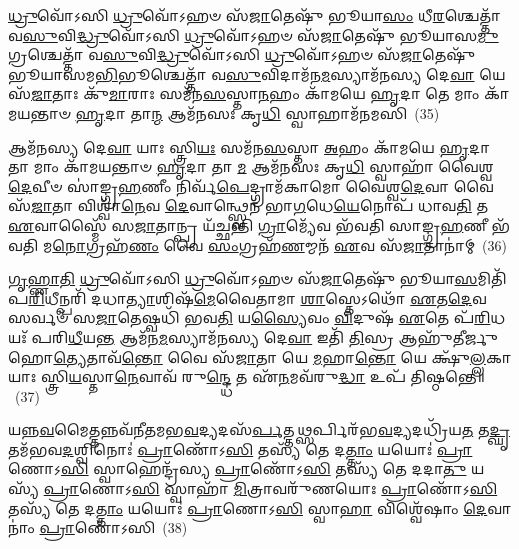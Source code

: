 {\anuvakamend[{𑌵𑌿 𑌹𑍍𑌯᳴𑌷𑍍𑌟𑌾𑌵𑌿𑍞᳴𑌶𑌤𑌿𑌶𑍍𑌚}]}%

\-\ul{𑌧𑍍𑌰𑍁}\-𑌵𑍋᳴\-𑌽𑌸𑌿 \ul{𑌧𑍍𑌰𑍁}\-𑌵𑍋᳴\-𑌽𑌹𑍞 𑌸᳴\-\ul{𑌜𑌾}\-𑌤𑍇𑌷𑍁᳴ 𑌭𑍂𑌯𑌾\-\ul{𑌸𑌂} 𑌧𑍀\-\ul{𑌰}\-𑌶𑍍𑌚𑍇𑌤𑍍𑌤𑌾᳴ 𑌵\-\ul{𑌸𑍁}\-𑌵𑌿\-\ul{𑌦𑍍𑌧𑍍𑌰𑍁}\-𑌵𑍋᳴\-𑌽𑌸𑌿 \ul{𑌧𑍍𑌰𑍁}\-𑌵𑍋᳴\-𑌽𑌹𑍞 𑌸᳴\-\ul{𑌜𑌾}\-𑌤𑍇𑌷𑍁᳴ 𑌭𑍂𑌯𑌾𑌸\-\ul{𑌮𑍁}\-𑌗𑍍𑌰𑌶𑍍𑌚𑍇𑌤𑍍𑌤𑌾᳴ 𑌵\-\ul{𑌸𑍁}\-𑌵𑌿\-\ul{𑌦𑍍𑌧𑍍𑌰𑍁}\-𑌵𑍋᳴\-𑌽𑌸𑌿 \ul{𑌧𑍍𑌰𑍁}\-𑌵𑍋᳴\-𑌽𑌹𑍞 𑌸᳴\-\ul{𑌜𑌾}\-𑌤𑍇𑌷𑍁᳴ 𑌭𑍂𑌯𑌾𑌸𑌮\-\ul{𑌭𑌿}\-𑌭𑍂𑌶𑍍𑌚𑍇𑌤𑍍𑌤𑌾᳴ 𑌵\-\ul{𑌸𑍁}\-𑌵𑌿𑌦𑌾𑌮᳴𑌨\-\ul{𑌮}\-𑌸𑍍𑌯𑌾𑌮᳴𑌨𑌸𑍍𑌯 𑌦𑍇\-\ul{𑌵𑌾} 𑌯𑍇 𑌸᳴\-\ul{𑌜𑌾}\-𑌤𑌾𑌃 𑌕𑍁᳴\-\ul{𑌮𑌾}\-𑌰𑌾𑌃 𑌸𑌮᳴𑌨\-\ul{𑌸}\-𑌸𑍍𑌤𑌾\-\ul{𑌨}\-𑌹𑌂 𑌕𑌾᳴𑌮𑌯𑍇 \ul{𑌹𑍃}\-𑌦𑌾 𑌤𑍇 𑌮𑌾𑌂 𑌕𑌾᳴𑌮𑌯𑌨𑍍𑌤𑌾𑍞 \ul{𑌹𑍃}\-𑌦𑌾 𑌤𑌾\-\ul{𑌨𑍍𑌮} 𑌆𑌮᳴𑌨𑌸𑌃 𑌕𑍃\-\ul{𑌧𑌿} 𑌸𑍍𑌵𑌾𑌹𑌾𑌮᳴𑌨𑌮𑌸𑌿~(35)

𑌆𑌮᳴𑌨𑌸𑍍𑌯 𑌦𑍇\-\ul{𑌵𑌾} 𑌯𑌾𑌃 𑌸𑍍𑌤𑍍𑌰𑌿\-\ul{𑌯𑌃} 𑌸𑌮᳴𑌨\-\ul{𑌸}\-𑌸𑍍𑌤𑌾 \ul{𑌅}\-𑌹𑌂 𑌕𑌾᳴𑌮𑌯𑍇 \ul{𑌹𑍃}\-𑌦𑌾 𑌤𑌾 𑌮𑌾𑌂 𑌕𑌾᳴𑌮𑌯𑌨𑍍𑌤𑌾𑍞 \ul{𑌹𑍃}\-𑌦𑌾 𑌤𑌾 \ul{𑌮} 𑌆𑌮᳴𑌨𑌸𑌃 𑌕𑍃\-\ul{𑌧𑌿} 𑌸𑍍𑌵𑌾𑌹𑌾᳴ 𑌵𑍈𑌶𑍍𑌵\-\ul{𑌦𑍇}\-𑌵𑍀𑍞 𑌸𑌾॑𑌙𑍍𑌗𑍍𑌰\-\ul{𑌹}\-𑌣𑍀𑌂 𑌨𑌿𑌰𑍍𑌵᳴\-\ul{𑌪𑍇}\-𑌦𑍍𑌗𑍍𑌰𑌾𑌮᳴𑌕𑌾𑌮𑍋 𑌵𑍈𑌶𑍍𑌵\-\ul{𑌦𑍇}\-𑌵𑌾 𑌵𑍈 𑌸᳴\-\ul{𑌜𑌾}\-𑌤𑌾 𑌵𑌿𑌶𑍍𑌵𑌾᳴\-\ul{𑌨𑍇}\-𑌵 \ul{𑌦𑍇}\-𑌵𑌾𑌨𑍍𑌥𑍍𑌸𑍍𑌵𑍇𑌨᳴ 𑌭𑌾\-\ul{𑌗}\-𑌧𑍇\-\ul{𑌯𑍇}\-𑌨𑍋𑌪᳴ 𑌧𑌾𑌵\-\ul{𑌤𑌿} 𑌤 \ul{𑌏}\-𑌵𑌾𑌸𑍍𑌮𑍈᳴ 𑌸\-\ul{𑌜𑌾}\-𑌤𑌾𑌨𑍍𑌪𑍍𑌰 𑌯᳴𑌚𑍍𑌛𑌨𑍍𑌤𑌿 \ul{𑌗𑍍𑌰𑌾}\-𑌮𑍍𑌯𑍇᳴𑌵 𑌭᳴𑌵𑌤𑌿 𑌸𑌾𑌙𑍍𑌗𑍍𑌰\-\ul{𑌹}\-𑌣𑍀 𑌭᳴𑌵𑌤𑌿 𑌮\-\ul{𑌨𑍋}\-𑌗𑍍𑌰𑌹᳴\-\ul{𑌣𑌂} 𑌵𑍈 \ul{𑌸𑌂}\-𑌗𑍍𑌰𑌹᳴\-\ul{𑌣}\-𑌮𑍍𑌮𑌨᳴ \ul{𑌏}\-𑌵 𑌸᳴\-\ul{𑌜𑌾}\-𑌤𑌾𑌨𑌾॑𑌮𑍍~(36)

\-\ul{𑌗𑍃}\-\-\ul{𑌹𑍍𑌣𑌾}\-\-\ul{𑌤𑌿} \ul{𑌧𑍍𑌰𑍁}\-𑌵𑍋᳴\-𑌽𑌸𑌿 \ul{𑌧𑍍𑌰𑍁}\-𑌵𑍋᳴\-𑌽𑌹𑍞 𑌸᳴\-\ul{𑌜𑌾}\-𑌤𑍇𑌷𑍁᳴ 𑌭𑍂𑌯𑌾\-\ul{𑌸}\-𑌮𑌿𑌤𑌿᳴ 𑌪\-\ul{𑌰𑌿}\-𑌧𑍀𑌨𑍍𑌪𑌰𑌿᳴ 𑌦𑌧𑌾\-\ul{𑌤𑍍𑌯𑌾}\-𑌶𑌿𑌷᳴\-\ul{𑌮𑍇}\-𑌵𑍈𑌤𑌾𑌮𑌾 \ul{𑌶𑌾}\-𑌸𑍍𑌤𑍇\-𑌽𑌥𑍋᳴ \ul{𑌏}\-𑌤\-\ul{𑌦𑍇}\-𑌵 𑌸𑌰𑍍𑌵𑍞᳴ 𑌸\-\ul{𑌜𑌾}\-𑌤𑍇𑌷𑍍𑌵𑌧𑌿᳴ 𑌭𑌵\-\ul{𑌤𑌿} 𑌯\-\ul{𑌸𑍍𑌯𑍈}\-𑌵𑌂 \ul{𑌵𑌿}\-𑌦𑍁𑌷᳴ \ul{𑌏}\-𑌤𑍇 𑌪᳴\-\ul{𑌰𑌿}\-𑌧𑌯𑌃᳴ 𑌪𑌰𑌿\-\ul{𑌧𑍀}\-𑌯\-\ul{𑌨𑍍𑌤} 𑌆𑌮᳴𑌨\-\ul{𑌮}\-𑌸𑍍𑌯𑌾𑌮᳴𑌨𑌸𑍍𑌯 𑌦𑍇\-\ul{𑌵𑌾} 𑌇𑌤𑌿᳴ \ul{𑌤𑌿}\-𑌸𑍍𑌰 𑌆𑌹𑍁᳴𑌤𑍀𑌰𑍍𑌜𑍁𑌹𑍋\-\ul{𑌤𑍍𑌯𑍇}\-𑌤𑌾𑌵᳴\-\ul{𑌨𑍍𑌤𑍋} 𑌵𑍈 𑌸᳴\-\ul{𑌜𑌾}\-𑌤𑌾 𑌯𑍇 \ul{𑌮}\-𑌹𑌾\-\ul{𑌨𑍍𑌤𑍋} 𑌯𑍇 𑌕𑍍𑌷𑍁᳴\-\ul{𑌲𑍍𑌲}\-𑌕𑌾 𑌯𑌾𑌃 𑌸𑍍𑌤𑍍𑌰𑌿\-\ul{𑌯}\-𑌸𑍍𑌤𑌾\-\ul{𑌨𑍇}\-𑌵𑌾𑌵᳴ 𑌰𑍁\-\ul{𑌨𑍍𑌦𑍍𑌧𑍇} 𑌤 𑌏᳴\-\ul{𑌨}\-𑌮𑌵᳴𑌰𑍁\-\ul{𑌦𑍍𑌧𑌾} 𑌉𑌪᳴ 𑌤𑌿𑌷𑍍𑌠𑌨𑍍𑌤𑍇॥~(37)

{\anuvakamend[{𑌸𑍍𑌵𑌾𑌹𑌾𑌮᳴𑌨𑌮𑌸𑌿 𑌸\-\ul{𑌜𑌾}\-𑌤𑌾𑌨𑌾𑍞᳴ 𑌰𑍁\-\ul{𑌨𑍍𑌦𑍍𑌧𑍇} 𑌪𑌞𑍍𑌚᳴ 𑌚}]}%

𑌯𑌨𑍍𑌨\-\ul{𑌵}\-𑌮𑍈𑌤𑍍𑌤𑌨𑍍𑌨𑌵᳴𑌨𑍀𑌤𑌮𑌭\-\ul{𑌵}\-𑌦𑍍𑌯𑌦𑌸᳴\-\ul{𑌰𑍍𑌪}\-𑌤𑍍𑌤\-\ul{𑌥𑍍𑌸}\-𑌰𑍍𑌪𑌿𑌰᳴𑌭\-\ul{𑌵}\-𑌦𑍍𑌯𑌦𑌧𑍍𑌰𑌿᳴𑌯\-\ul{𑌤} 𑌤\-\ul{𑌦𑍍𑌘𑍃}\-𑌤𑌮᳴𑌭𑌵\-\ul{𑌦}\-𑌶𑍍𑌵𑌿𑌨𑍋𑌃॑ \ul{𑌪𑍍𑌰𑌾}\-𑌣𑍋᳴\-𑌽\-\ul{𑌸𑌿} 𑌤𑌸𑍍𑌯᳴ 𑌤𑍇 𑌦\-\ul{𑌤𑍍𑌤𑌾𑌂} 𑌯𑌯𑍋𑌃॑ \ul{𑌪𑍍𑌰𑌾}\-𑌣𑍋\-𑌽\-\ul{𑌸𑌿} 𑌸𑍍𑌵𑌾𑌹𑍇𑌨𑍍𑌦𑍍𑌰᳴𑌸𑍍𑌯 \ul{𑌪𑍍𑌰𑌾}\-𑌣𑍋᳴\-𑌽\-\ul{𑌸𑌿} 𑌤𑌸𑍍𑌯᳴ 𑌤𑍇 𑌦𑌦𑌾\-\ul{𑌤𑍁} 𑌯𑌸𑍍𑌯᳴ \ul{𑌪𑍍𑌰𑌾}\-𑌣𑍋\-𑌽\-\ul{𑌸𑌿} 𑌸𑍍𑌵𑌾𑌹𑌾᳴ \ul{𑌮𑌿}\-𑌤𑍍𑌰𑌾𑌵𑌰𑍁᳴𑌣𑌯𑍋𑌃 \ul{𑌪𑍍𑌰𑌾}\-𑌣𑍋᳴\-𑌽\-\ul{𑌸𑌿} 𑌤𑌸𑍍𑌯᳴ 𑌤𑍇 𑌦\-\ul{𑌤𑍍𑌤𑌾𑌂} 𑌯𑌯𑍋𑌃॑ \ul{𑌪𑍍𑌰𑌾}\-𑌣𑍋\-𑌽\-\ul{𑌸𑌿} 𑌸𑍍𑌵𑌾\-\ul{𑌹𑌾} 𑌵𑌿𑌶𑍍𑌵𑍇᳴𑌷𑌾𑌂 \ul{𑌦𑍇}\-𑌵𑌾𑌨𑌾𑌂॑ \ul{𑌪𑍍𑌰𑌾}\-𑌣𑍋᳴\-𑌽𑌸𑌿~(38)

